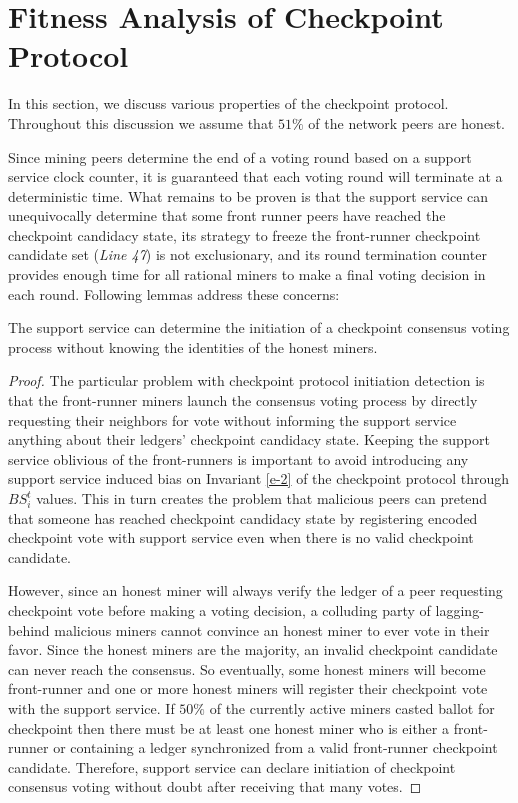         
\section{Fitness Analysis of Checkpoint Protocol}
\label{s-analysis}
In this section, we discuss various properties of the checkpoint protocol. Throughout this discussion we assume that $51\%$ of the network peers are honest.

Since mining peers determine the end of a voting round based on a support service clock counter, it is guaranteed that each voting round will terminate at a deterministic time. What remains to be proven is that the support service can unequivocally determine that some front runner peers have reached the checkpoint candidacy state, its strategy to freeze the front-runner checkpoint candidate set (\textit{Line 47}) is not exclusionary, and its round termination counter provides enough time for all rational miners to make a final voting decision in each round. Following lemmas address these concerns:     

\begin{lemma}
\label{l-proto-init}
The support service can determine the initiation of a checkpoint consensus voting process without knowing the identities of the honest miners.  
\end{lemma}
\begin{proof}
The particular problem with checkpoint protocol initiation detection is that the front-runner miners launch the consensus voting process by directly requesting their neighbors for vote without informing the support service anything about their ledgers' checkpoint candidacy state. Keeping the support service oblivious of the front-runners is important to avoid introducing any support service induced bias on Invariant \ref{e-2} of the checkpoint protocol through $BS_i^t$ values. This in turn creates the problem that malicious peers can pretend that someone has reached checkpoint candidacy state by registering encoded checkpoint vote with support service even when there is no valid checkpoint candidate.

However, since an honest miner will always verify the ledger of a peer requesting checkpoint vote before making a voting decision, a colluding party of lagging-behind malicious miners cannot convince an honest miner to ever vote in their favor. Since the honest miners are the majority, an invalid checkpoint candidate can never reach the consensus. So eventually, some honest miners will become front-runner and one or more honest miners will register their checkpoint vote with the support service. If $50\%$ of the currently active miners casted ballot for checkpoint then there must be at least one honest miner who is either a front-runner or containing a ledger synchronized from a valid front-runner checkpoint candidate. Therefore, support service can declare initiation of checkpoint consensus voting without doubt after receiving that many votes. 
\end{proof}

